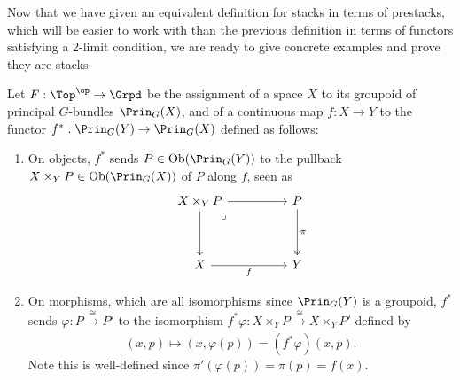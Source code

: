 Now that we have given an equivalent definition for stacks in terms of prestacks, which will be easier to work with than the previous definition in terms of functors satisfying a 2-limit condition, we are ready to give concrete examples and prove they are stacks.

\begin{example}
    Let $F: \Top^{\op} \to \Grpd$ be the assignment of a space $X$ to its groupoid of principal $G$-bundles $\Prin_{G}(X)$, and of a continuous map $f: X \to Y$ to the functor $f^*: \Prin_{G}(Y) \to \Prin_{G}(X)$ defined as follows:
    \begin{enumerate}
        \item On objects, $f^*$ sends $P \in \text{Ob}(\Prin_{G}(Y))$ to the pullback $X \times_{Y} P \in \text{Ob}(\Prin_{G}(X))$ of $P$ along $f$, seen as
        \[\begin{tikzcd}
        	{X \times_{Y} P} && P \\
        	\\
        	X && Y
        	\arrow[from=1-1, to=1-3]
        	\arrow[from=1-1, to=3-1]
        	\arrow["\lrcorner"{anchor=center, pos=0.125}, draw=none, from=1-1, to=3-3]
        	\arrow["\pi", two heads, from=1-3, to=3-3]
        	\arrow["f"', from=3-1, to=3-3]
        \end{tikzcd}\]
        \item On morphisms, which are all isomorphisms since $\Prin_{G}(Y)$ is a groupoid, $f^*$ sends $\varphi: P \xrightarrow[]{\cong} P'$ to the isomorphism $f^*\varphi : X \times_{Y} P \xrightarrow[]{\cong} X \times_{Y} P'$ defined by
        $$
        (x, p) \mapsto (x, \varphi(p)) = (f^*\varphi)(x,p).
        $$
        Note this is well-defined since \( \pi'(\varphi(p)) = \pi(p) = f(x). \)
    \end{enumerate}


\end{example}
